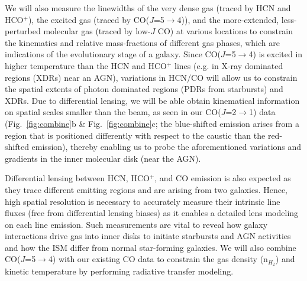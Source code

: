 \documentclass[12pt,a4paper]{article}
\newcommand{\rarr}{$\rightarrow$}
\newcommand{\bco}{\mbox{CO($J$=2\rarr1)}\xspace}
\newcommand{\eco}{\mbox{CO($J$=5\rarr4)}\xspace}
\newcommand{\hcop}{HCO$^+$\xspace}
\newcommand{\Fig}[1]{Fig.~\ref{fig:#1}}
\begin{document}
We will also measure the linewidths of the very dense gas (traced by HCN and \hcop), 
the excited gas (traced by \eco), and the more-extended, less-perturbed 
molecular gas (traced by low-$J$ CO) at various locations to constrain 
the kinematics and relative mass-fractions of different gas phases, 
which are indications of the evolutionary stage of a galaxy.
Since \eco is excited in higher temperature than the HCN and \hcop lines (e.g. in 
X-ray dominated regions (XDRs) near an AGN), 
variations in HCN/CO will allow us to constrain the spatial extents of photon dominated regions
 (PDRs from starbursts) and XDRs.
Due to differential lensing, we will be able obtain kinematical information
on spatial scales smaller than the beam, as seen in our 
\bco data (\Fig{combine}b \& \Fig{combine}c; the blue-shifted emission
arises from a region that is positioned differently with respect to the caustic
than the red-shifted emission), thereby
enabling us to probe the aforementioned variations 
and gradients in the inner molecular disk (near the AGN). 

Differential lensing between HCN, \hcop, and CO emission is also expected 
as they trace different emitting regions and are arising from two galaxies. 
Hence, high spatial resolution is necessary to accurately measure their intrinsic 
line fluxes (free from differential
lensing biases) as it enables a detailed lens modeling on each line emission.
Such measurements are vital to reveal how galaxy interactions drive gas into 
inner disks to initiate starbursts and AGN activities and how the ISM differ from 
normal star-forming galaxies.
We will also combine \eco with our existing CO data to constrain the gas density (n$_{H_{2}}$) 
and kinetic temperature by performing radiative transfer modeling. 
\end{document}
